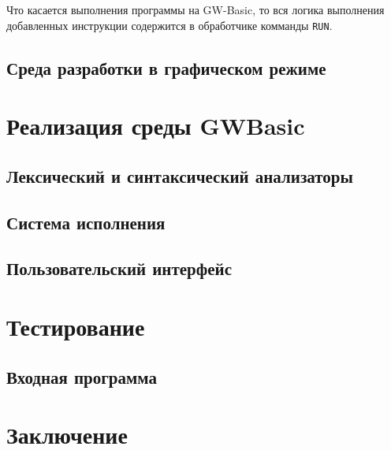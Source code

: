 \documentclass[12pt]{article}
\begin{document}
			\indent Что касается выполнения программы на GW-Basic, то вся логика выполнения добавленных инструкции содержится в обработчике комманды {\tt RUN}.
			\subsection{Среда разработки в графическом режиме}
	\newpage
	\section{Реализация среды GWBasic}
		\subsection{Лексический и синтаксический анализаторы}
		\subsection{Система исполнения}
		\subsection{Пользовательский интерфейс}
	\newpage
	\section{Тестирование}
		\subsection{Входная программа}
	\newpage	
	\section{Заключение}
	\newpage
	\nocite{*}
			
	
	
	\newpage
	\tableofcontents %
\end{document}
